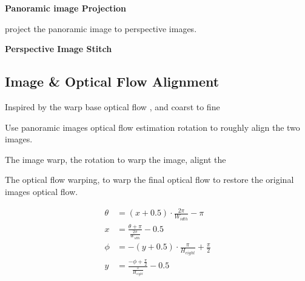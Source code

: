\textbf{Panoramic image Projection}

project the panoramic image to perspective images.


\textbf{Perspective Image Stitch}



\subsection{Image \& Optical Flow Alignment}

Inspired by the warp base optical flow \cite{?}, and coarst to fine 

Use panoramic images optical flow estimation rotation to roughly align the two images.


The image warp, the rotation to warp the image, alignt the 

The optical flow warping, to warp the final optical flow to restore the original images optical flow.

\begin{equation}\label{equ:app:sph2erp}
	\begin{split}
		\theta &= (x+0.5) \cdot\frac{2 \pi}{W_{idth}}- \pi
		\\
		x &= \frac{\theta + \pi}{\frac{2\pi}{W_{idth}}} - 0.5
		\\
		\phi&=-(y+0.5) \cdot \frac{\pi}{H_{eight}} + \frac{\pi}{2}
		\\
		y &=\frac{-\phi+\frac{\pi}{2}}{\frac{\pi}{H_{eight}}}-0.5
	\end{split}
\end{equation}
